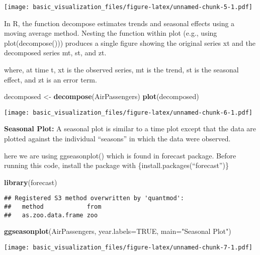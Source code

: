 \documentclass[
]{article}
\newenvironment{Shaded}{\begin{snugshade}}{\end{snugshade}}
\newcommand{\AttributeTok}[1]{\textcolor[rgb]{0.13,0.29,0.53}{#1}}
\newcommand{\ConstantTok}[1]{\textcolor[rgb]{0.56,0.35,0.01}{#1}}
\newcommand{\FunctionTok}[1]{\textcolor[rgb]{0.13,0.29,0.53}{\textbf{#1}}}
\newcommand{\NormalTok}[1]{#1}
\newcommand{\OtherTok}[1]{\textcolor[rgb]{0.56,0.35,0.01}{#1}}
\newcommand{\StringTok}[1]{\textcolor[rgb]{0.31,0.60,0.02}{#1}}
\begin{document}
\texttt{[image: basic\_visualization\_files/figure-latex/unnamed-chunk-5-1.pdf]}

In R, the function decompose estimates trends and seasonal effects using
a moving average method. Nesting the function within plot (e.g., using
plot(decompose())) produces a single figure showing the original series
xt and the decomposed series mt, st, and zt.

where, at time t, xt is the observed series, mt is the trend, st is the
seasonal effect, and zt is an error term.

\begin{Shaded}
\begin{Highlighting}[]
\NormalTok{decomposed }\OtherTok{\textless{}{-}} \FunctionTok{decompose}\NormalTok{(AirPassengers)}
\FunctionTok{plot}\NormalTok{(decomposed)}
\end{Highlighting}
\end{Shaded}

\texttt{[image: basic\_visualization\_files/figure-latex/unnamed-chunk-6-1.pdf]}

\textbf{Seasonal Plot:} A seasonal plot is similar to a time plot except
that the data are plotted against the individual ``seasons'' in which
the data were observed.

here we are using ggseasonplot() which is found in forecast package.
Before running this code, install the package with
\{install.packages(``forecast'')\}

\begin{Shaded}
\begin{Highlighting}[]
\FunctionTok{library}\NormalTok{(forecast)}
\end{Highlighting}
\end{Shaded}

\begin{verbatim}
## Registered S3 method overwritten by 'quantmod':
##   method            from
##   as.zoo.data.frame zoo
\end{verbatim}

\begin{Shaded}
\begin{Highlighting}[]
\FunctionTok{ggseasonplot}\NormalTok{(AirPassengers, }\AttributeTok{year.labels=}\ConstantTok{TRUE}\NormalTok{, }\AttributeTok{main=}\StringTok{"Seasonal Plot"}\NormalTok{)}
\end{Highlighting}
\end{Shaded}

\texttt{[image: basic\_visualization\_files/figure-latex/unnamed-chunk-7-1.pdf]}
\end{document}
